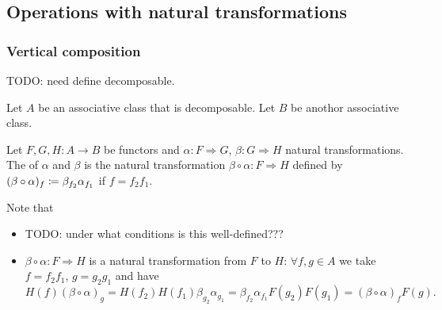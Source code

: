 \subsection{Operations with natural transformations}
\subsubsection{Vertical composition}
TODO: need define decomposable.
\begin{definition}
Let $A$ be an associative class that is decomposable. Let $B$ be anothor associative class.

Let $F,G,H: A\to B$ be functors and $\alpha: F\Rightarrow G$, $\beta: G\Rightarrow H$ natural transformations. The  of $\alpha$ and $\beta$ is the natural transformation $\beta\circ\alpha: F\Rightarrow H$ defined by
$(\beta\circ\alpha)_{f} \coloneqq \beta_{f_2}\alpha_{f_1}$ if $f = f_2f_1$.
\end{definition}
Note that
\begin{itemize}
\item TODO: under what conditions is this well-defined???
\item $\beta\circ\alpha: F\Rightarrow H$ is a natural transformation from $F$ to $H$: $\forall f,g\in A$ we take $f = f_2f_1$, $g = g_2g_1$ and have
\[ H(f)(\beta\circ\alpha)_g = H(f_2)H(f_1)\beta_{g_2}\alpha_{g_1} =  \beta_{f_2}\alpha_{f_1}F(g_2)F(g_1) = (\beta\circ\alpha)_{f}F(g). \]
\end{itemize} 


